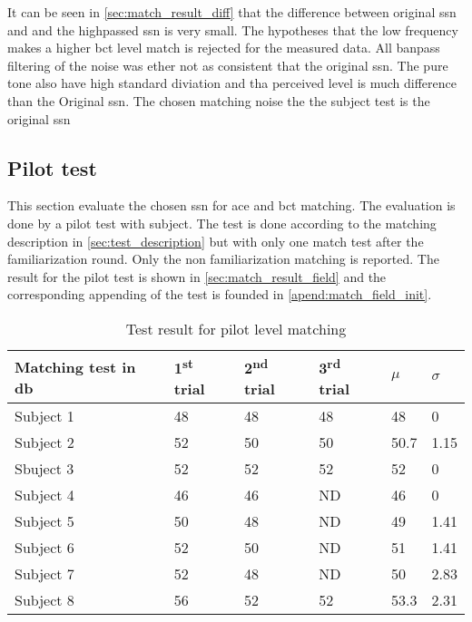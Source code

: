 It can be seen in \autoref{sec:match_result_diff} that the difference between original \gls{ssn} and and the highpassed \gls{ssn} is very small. The hypotheses that the low frequency makes a higher \gls{bct} level match is rejected for the measured data. All banpass filtering of the noise was ether not as consistent that the original \gls{ssn}. The pure tone also have high standard diviation and tha perceived level is much difference than the Original \gls{ssn}. The chosen matching noise the the subject test is the original \gls{ssn}



\subsection{Pilot test}
This section evaluate the chosen \gls{ssn} for \gls{ace} and \gls{bct} matching. The evaluation is done by a pilot test with subject. The test is done according to the matching description in \autoref{sec:test_description} but with only one match test after the familiarization round. Only the non familiarization matching is reported. The result for the pilot test is shown in \autoref{sec:match_result_field} and the corresponding appending of the test is founded in \autoref{apend:match_field_init}.

\begin{table}[H]
\centering
\caption{Test result for pilot level matching}
\begin{tabular}{l|lll|ll}
Matching test in \si{\decibel}   & 1\textsuperscript{st} trial & 2\textsuperscript{nd} trial & 3\textsuperscript{rd} trial & $\mu$ & $\sigma$ \\ \hline
Subject 1  & 48          & 48           & 48          & 48          & 0                  \\
Subject 2  & 52          & 50           & 50          & 50.7        & 1.15               \\
Sbuject 3  & 52          & 52           & 52          & 52          & 0                  \\
Subject 4  & 46          & 46           & ND          & 46          & 0                  \\
Subject 5  & 50          & 48           & ND          & 49          & 1.41               \\
Subject 6  & 52          & 50           & ND          & 51          & 1.41               \\
Subject 7  & 52          & 48           & ND          & 50          & 2.83               \\
Subject 8  & 56          & 52           & 52          & 53.3        & 2.31             
\end{tabular}
\label{sec:match_result_field}
\end{table}

